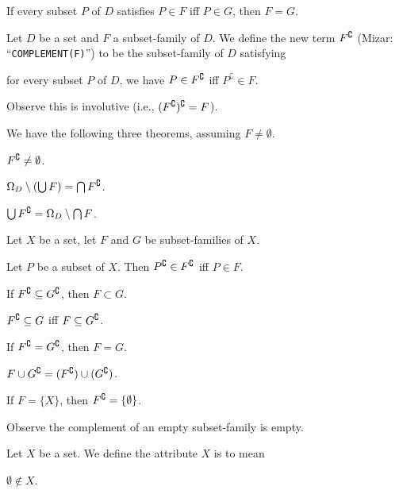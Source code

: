 \documentclass{article}
\begin{document}
\begin{thm}
\item\label{setfam1:31} If every subset $P$ of $D$ satisfies $P\in F$
  iff $P\in G$, then $F=G$.
\end{thm}

\begin{definition}
Let $D$ be a set and $F$ a subset-family of $D$.
We define the new term $F^{\complement}$ (Mizar: ``\verb#COMPLEMENT(F)#'') to be the subset-family of $D$ satisfying
\begin{defn}
\item for every subset $P$ of $D$, we have $P\in F^{\complement}$ iff
  $P^{\complement}\in F$.
\end{defn}
Observe this is involutive (i.e., $(F^{\complement})^{\complement}=F$).
\end{definition}

We have the following three theorems, assuming $F\neq\emptyset$.
\begin{thm}
\item\label{setfam1:32} $F^{\complement}\neq\emptyset$.
\item\label{setfam1:33} $\Omega_{D}\setminus(\bigcup F)=\bigcap F^{\complement}$.
\item\label{setfam1:34} $\bigcup F^{\complement}=\Omega_{D}\setminus\bigcap F$.
\end{thm}

Let $X$ be a set, let $F$ and $G$ be subset-families of $X$.
\begin{thm}
\item\label{setfam1:35} Let $P$ be a subset of $X$. Then
  $P^{\complement}\in F^{\complement}$ iff $P\in F$.
\item\label{setfam1:36} If $F^{\complement}\subseteq G^{\complement}$, then
  $F\subset G$.
\item\label{setfam1:37} $F^{\complement}\subseteq G$ iff $F\subseteq G^{\complement}$.
\item\label{setfam1:38} If $F^{\complement}=G^{\complement}$, then $F=G$.
\item\label{setfam1:39} $F\cup G^{\complement}=(F^{\complement})\cup(G^{\complement})$.
\item\label{setfam1:40} If $F=\{X\}$, then $F^{\complement}=\{\emptyset\}$.
\end{thm}

Observe the complement of an empty subset-family is empty.

\begin{definition}
Let $X$ be a set. We define the attribute $X$ is 
to mean
\begin{defn}
\item $\emptyset\notin X$.
\end{defn}
\end{definition}
\end{document}
